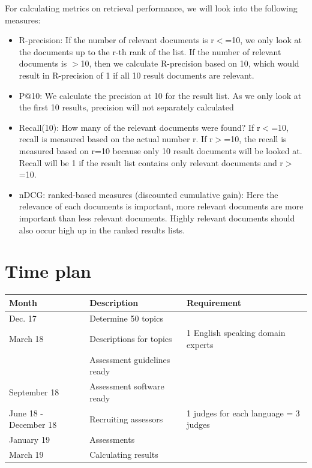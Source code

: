 \documentclass[a4paper,11pt]{article}
\begin{document}
For calculating metrics on retrieval performance, we will look into the following measures:
\begin{itemize}
\item R-precision: If the number of relevant documents is r$<$=10, we only look at the documents up to the r-th rank of the list. If the number of relevant documents is $>$10, then we calculate R-precision based on 10, which would result in R-precision of 1 if all 10 result documents are relevant.
\item P@10: We calculate the precision at 10 for the result list. As we only look at the first 10 results, precision will not separately calculated
\item Recall(10): How many of the relevant documents were found? If r$<$=10, recall is measured based on the actual number r. If r$>$=10, the recall is measured based on r=10 because only 10 result documents will be looked at. Recall will be 1 if the result list contains only relevant documents and r$>$=10.
\item nDCG: ranked-based measures (discounted cumulative gain): Here the relevance of each documents is important, more relevant documents are more important than less relevant documents. Highly relevant documents should also occur high up in the ranked results lists.
\end{itemize}

\section{Time plan}

\begin{tabular}{|l|p{3cm}|p{3cm}|}
\hline
\textbf{Month} & \textbf{Description} & \textbf{Requirement} \\ \hline
Dec. 17 & Determine 50 topics & %
\\ \hline
March 18 & Descriptions for topics & 1 English speaking domain experts \\ \hline
& Assessment guidelines ready & %
\\ \hline
September 18 & Assessment software ready & %
\\ \hline
June 18 - December 18 & Recruiting assessors & 1 judges for each language = 3 judges \\ \hline
January 19 & Assessments & %
\\ \hline
March 19 & Calculating results & %
\\ \hline
\end{tabular}
\end{document}
